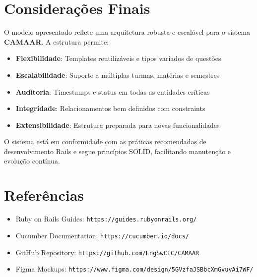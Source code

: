 \documentclass[a4paper,12pt]{article}
\begin{document}
\section{Considerações Finais}

O modelo apresentado reflete uma arquitetura robusta e escalável para o sistema \textbf{CAMAAR}. A estrutura permite:

\begin{itemize}
    \item \textbf{Flexibilidade}: Templates reutilizáveis e tipos variados de questões
    \item \textbf{Escalabilidade}: Suporte a múltiplas turmas, matérias e semestres
    \item \textbf{Auditoria}: Timestamps e status em todas as entidades críticas
    \item \textbf{Integridade}: Relacionamentos bem definidos com constraints
    \item \textbf{Extensibilidade}: Estrutura preparada para novas funcionalidades
\end{itemize}

O sistema está em conformidade com as práticas recomendadas de desenvolvimento Rails e segue princípios SOLID, facilitando manutenção e evolução contínua.

\section*{Referências}

\begin{itemize}
    \item Ruby on Rails Guides: \texttt{https://guides.rubyonrails.org/}
    \item Cucumber Documentation: \texttt{https://cucumber.io/docs/}
    \item GitHub Repository: \texttt{https://github.com/EngSwCIC/CAMAAR}
    \item Figma Mockups: \texttt{https://www.figma.com/design/5GVzfaJSBbcXmGvuvAi7WF/}
\end{itemize}
\end{document}
